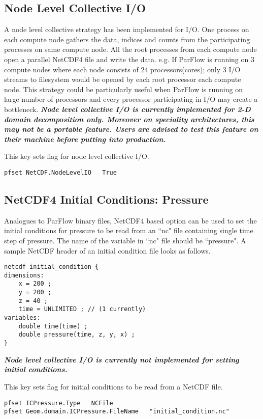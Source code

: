 \subsection{Node Level Collective I/O}
A node level collective strategy has been implemented for I/O. One process on each compute node gathers the data, indices and counts from the participating processes on same compute node. All the root processes from each compute node open a parallel NetCDF4 file and write the data. e.g. If ParFlow is running on 3 compute nodes where each node consists of 24 processors(cores); only 3 I/O streams to filesystem would be opened by each root processor each compute node. This strategy could be particularly useful when ParFlow is running on large number of processors and every processor participating in I/O may create a bottleneck.
\textit{\textbf{Node level collective I/O is currently implemented for 2-D domain decomposition only. Moreover on speciality architectures, this may not be a portable feature. Users are advised to test this feature on their machine before putting into production.}}

{This key sets flag for node level collective I/O.} 
\begin{display}\begin{verbatim}
pfset NetCDF.NodeLevelIO   True
\end{verbatim}\end{display}

\subsection{NetCDF4 Initial Conditions: Pressure}
Analogues to ParFlow binary files, NetCDF4 based option can be used to set the initial conditions for pressure to be read from an ``nc" file containing single time step of pressure. The name of the variable in ``nc" file should be ``pressure". A sample NetCDF header of an initial condition file looks as follows.
\begin{display}\begin{verbatim}
netcdf initial_condition {
dimensions:
	x = 200 ;
	y = 200 ;
	z = 40 ;
	time = UNLIMITED ; // (1 currently)
variables:
	double time(time) ;
	double pressure(time, z, y, x) ;
}
\end{verbatim}\end{display}
\textit{\textbf{Node level collective I/O is currently not implemented for setting initial conditions.}}

{This key sets flag for initial conditions to be read from a NetCDF file.} 
\begin{display}\begin{verbatim}
pfset ICPressure.Type   NCFile
pfset Geom.domain.ICPressure.FileName   "initial_condition.nc"
\end{verbatim}\end{display}

